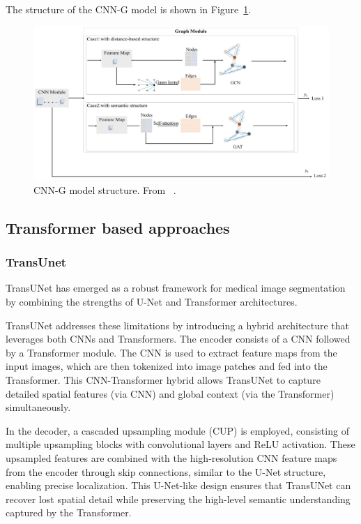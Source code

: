 The structure of the CNN-G model is shown in Figure~\ref{fig:cnng_structure}.
\begin{figure}
    \centering
    \includegraphics[width=0.8\linewidth]{images/cnng_structure.png}
    \caption{CNN-G model structure. From ~\cite{9103557}.}
    \label{fig:cnng_structure}
\end{figure}

\subsection{Transformer based approaches}
\subsubsection{TransUnet}
TransUNet \cite{chen2021transunettransformersmakestrong} has emerged as a robust framework for medical image segmentation by combining the strengths of U-Net and Transformer architectures.

TransUNet addresses these limitations by introducing a hybrid architecture that leverages both CNNs and Transformers. The encoder consists of a CNN followed by a Transformer module. The CNN is used to extract feature maps from the input images, which are then tokenized into image patches and fed into the Transformer. This CNN-Transformer hybrid allows TransUNet to capture detailed spatial features (via CNN) and global context (via the Transformer) simultaneously.

In the decoder, a cascaded upsampling module (CUP) is employed, consisting of multiple upsampling blocks with convolutional layers and ReLU activation. These upsampled features are combined with the high-resolution CNN feature maps from the encoder through skip connections, similar to the U-Net structure, enabling precise localization. This U-Net-like design ensures that TransUNet can recover lost spatial detail while preserving the high-level semantic understanding captured by the Transformer.

